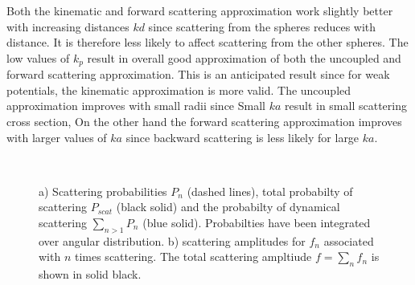 Both the kinematic and forward scattering approximation work slightly better with
increasing distances $kd$ since scattering from the spheres reduces with distance. It is therefore less likely to affect scattering from the other spheres.
The low values of $k_p$ result in overall good approximation of both the uncoupled and forward scattering approximation. This is an anticipated result since for weak potentials, the kinematic approximation is more valid.
The uncoupled approximation improves with small radii since Small $ka$ result in small scattering cross section,
On the other hand the forward scattering approximation improves with larger values of $ka$ since backward scattering is less likely for large $ka$.


\begin{figure}[h!]
  \centering
  \\
  \vspace{-1.1em}
  \caption{
a) Scattering probabilities $P_n$ (dashed lines), total probabilty of scattering
$P_{scat}$ (black solid) and the probabilty of dynamical scattering
$\sum_{n>1}P_n$ (blue solid).
Probabilties have been integrated over angular distribution.
b) scattering amplitudes for $f_n$ associated with $n$ times scattering. The total
scattering ampltiude $f=\sum_n f_n $ is shown in solid black.
}%
\end{figure}




%
%



